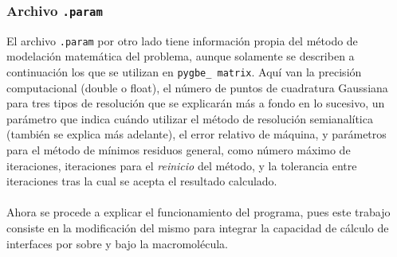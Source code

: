 \documentclass[12pt, oneside, numbers, spanish]{ezthesis}
\numberwithin{equation}{section}
\begin{document}
\subsubsection{Archivo \texttt{.param}}
El archivo \texttt{.param} por otro lado tiene información propia del método de modelación matemática del problema, aunque solamente se describen a continuación los que se utilizan en \texttt{pygbe\_ matrix}. Aquí van la precisión computacional (double o float), el número de puntos de cuadratura Gaussiana para tres tipos de resolución que se explicarán más a fondo en lo sucesivo, un parámetro que indica cuándo utilizar el método de resolución semianalítica (también se explica más adelante), el error relativo de máquina, y parámetros para el método de mínimos residuos general, como número máximo de iteraciones, iteraciones para el \textit{reinicio} del método, y la tolerancia entre iteraciones tras la cual se acepta el resultado calculado.\\\\
Ahora se procede a explicar el funcionamiento del programa, pues este trabajo consiste en la modificación del mismo para integrar la capacidad de cálculo de interfaces por sobre y bajo la macromolécula.
\end{document}
